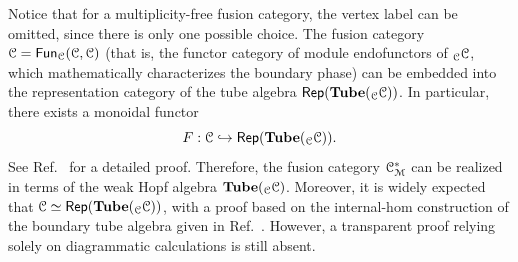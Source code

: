 \documentclass[a4paper,11pt]{article}
\theoremstyle{theorem}
\theoremstyle{remark}
\newcommand\eC           {\EuScript{C}}
\newcommand\eM          {\EuScript{M}}
\newcommand{\Rep}{\mathsf{Rep}}
\newcommand{\Fun}{\mathsf{Fun}}
\begin{document}
Notice that for a multiplicity-free fusion category, the vertex label can be omitted, since there is only one possible choice.
The fusion category \( \eC = \Fun_{\eC}(\eC, \eC) \) (that is, the functor category of module endofunctors of $_{\eC}\eC$, which mathematically characterizes the boundary phase) can be embedded into the representation category of the tube algebra $\Rep(\mathbf{Tube}({_{\eC}}\eC))$. In particular, there exists a monoidal functor
\begin{equation}
    F: \eC \hookrightarrow \Rep(\mathbf{Tube}({_{\eC}}\eC)).
\end{equation}
See Ref.~\cite{jia2025weakhopftubealgebra} for a detailed proof.  
Therefore, the fusion category \( \eC_{\eM}^{*} \) can be realized in terms of the weak Hopf algebra \( \mathbf{Tube}({_{\eC}}\eC) \). Moreover, it is widely expected that $\eC \simeq \Rep(\mathbf{Tube}({_{\eC}}\eC))$, with a proof based on the internal-hom construction of the boundary tube algebra given in Ref.~\cite{bai2025weakhopf}. However, a transparent proof relying solely on diagrammatic calculations is still absent.
\end{document}
